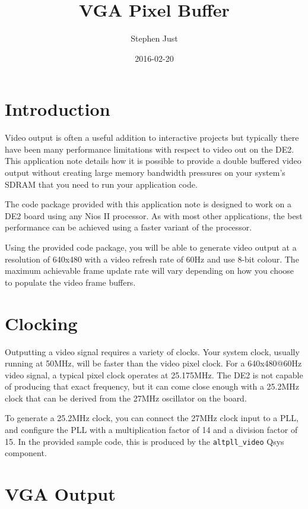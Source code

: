 \documentclass{capstonedoc}
\title{VGA Pixel Buffer}
\date{2016-02-20}
\author{Stephen Just}
\begin{document}
\maketitle

\section{Introduction}

Video output is often a useful addition to interactive projects but typically
there have been many performance limitations with respect to video out on the
DE2. This application note details how it is possible to provide a double
buffered video output without creating large memory bandwidth pressures on
your system's SDRAM that you need to run your application code.

The code package provided with this application note is designed to work on a
DE2 board using any Nios II processor. As with most other applications, the best
performance can be achieved using a faster variant of the processor.

Using the provided code package, you will be able to generate video output
at a resolution of 640x480 with a video refresh rate of 60Hz and use 8-bit
colour. The maximum achievable frame update rate will vary depending on how you
choose to populate the video frame buffers.

\section{Clocking}

Outputting a video signal requires a variety of clocks. Your system clock,
usually running at 50MHz, will be faster than the video pixel clock. For a
640x480@60Hz video signal, a typical pixel clock operates at 25.175MHz.
\cite{VGATiming} The DE2 is not capable of producing that exact frequency,
but it can come close enough with a 25.2MHz clock that can be derived from
the 27MHz oscillator on the board.

To generate a 25.2MHz clock, you can connect the 27MHz clock input to a PLL,
and configure the PLL with a multiplication factor of 14 and a division factor
of 15. In the provided sample code, this is produced by the
\texttt{altpll\_video} Qsys component.

\section{VGA Output}
\end{document}
